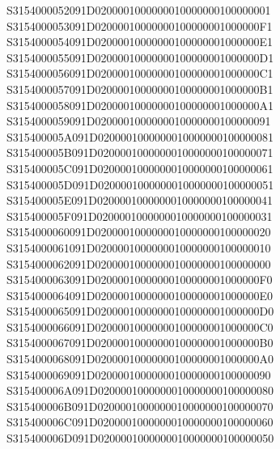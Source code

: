 \documentclass[12pt,a4paper]{article}
\begin{document}
\begin{framed}
{S3154000052091D0200001000000010000000100000001\newline
S3154000053091D02000010000000100000001000000F1\newline
S3154000054091D02000010000000100000001000000E1\newline
S3154000055091D02000010000000100000001000000D1\newline
S3154000056091D02000010000000100000001000000C1\newline
S3154000057091D02000010000000100000001000000B1\newline
S3154000058091D02000010000000100000001000000A1\newline
S3154000059091D0200001000000010000000100000091\newline
S315400005A091D0200001000000010000000100000081\newline
S315400005B091D0200001000000010000000100000071\newline
S315400005C091D0200001000000010000000100000061\newline
S315400005D091D0200001000000010000000100000051\newline
S315400005E091D0200001000000010000000100000041\newline
S315400005F091D0200001000000010000000100000031\newline
S3154000060091D0200001000000010000000100000020\newline
S3154000061091D0200001000000010000000100000010\newline
S3154000062091D0200001000000010000000100000000\newline
S3154000063091D02000010000000100000001000000F0\newline
S3154000064091D02000010000000100000001000000E0\newline
S3154000065091D02000010000000100000001000000D0\newline
S3154000066091D02000010000000100000001000000C0\newline
S3154000067091D02000010000000100000001000000B0\newline
S3154000068091D02000010000000100000001000000A0\newline
S3154000069091D0200001000000010000000100000090\newline
S315400006A091D0200001000000010000000100000080\newline
S315400006B091D0200001000000010000000100000070\newline
S315400006C091D0200001000000010000000100000060\newline
S315400006D091D0200001000000010000000100000050\newline
}
\end{framed}
\end{document}
